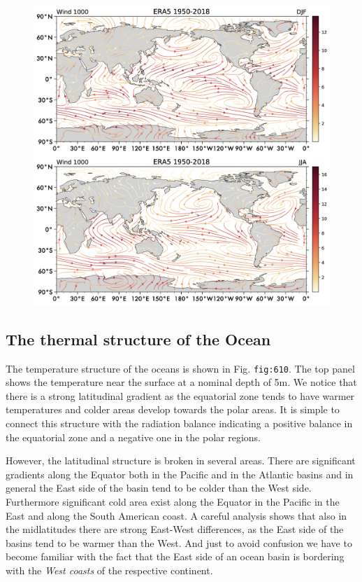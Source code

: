 \begin{figure}
	\centering
	\includegraphics[width = .7 \textwidth]{figs/GD/Wind1000.png}
	\caption{} \label{fig:}
\end{figure}

\subsection{The thermal structure of the
	Ocean}\label{the-thermal-structure-of-the-ocean}

The temperature structure of the oceans is shown in Fig.
\texttt{fig:610}. The top panel shows the temperature near the surface
at a nominal depth of 5m. We notice that there is a strong latitudinal
gradient as the equatorial zone tends to have warmer temperatures and
colder areas develop towards the polar areas. It is simple to connect
this structure with the radiation balance indicating a positive balance
in the equatorial zone and a negative one in the polar regions.

However, the latitudinal structure is broken in several areas. There are
significant gradients along the Equator both in the Pacific and in the
Atlantic basins and in general the East side of the basin tend to be
colder than the West side. Furthermore significant cold area exist along
the Equator in the Pacific in the East and along the South American
coast. A careful analysis shows that also in the midlatitudes there are
strong East-West differences, as the East side of the basins tend to be
warmer than the West. And just to avoid confusion we have to become
familiar with the fact that the East side of an ocean basin is bordering
with the \emph{West coasts} of the respective continent.

